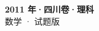 \documentclass[zihao=-4, a4paper]{ctexart}
\begin{document}
\begin{center}
  {\Large\bfseries 2011 年·四川卷·理科}\\[4pt]
  {\large 数学 · 试题版}
\end{center}
\medskip
{}

\end{document}
